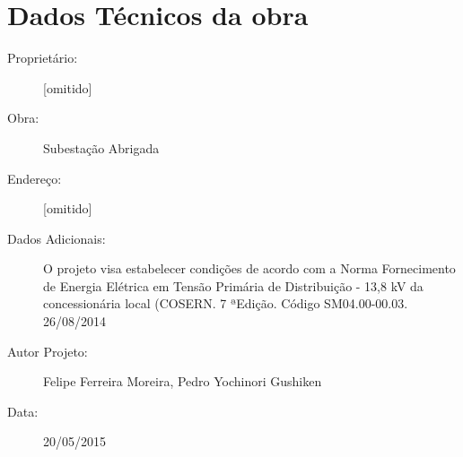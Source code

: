 \section{Dados Técnicos da obra}
\begin{description}
\item [Proprietário:] [omitido]
\item [Obra:] Subestação Abrigada
\item [Endereço:] [omitido]
\item [Dados Adicionais:] O projeto visa estabelecer condições de acordo com a Norma Fornecimento de Energia Elétrica em Tensão Primária de Distribuição - 13,8 kV da concessionária
local (COSERN. 7 ªEdição. Código SM04.00-00.03. 26/08/2014
\item [Autor Projeto:] Felipe Ferreira Moreira, Pedro Yochinori Gushiken
\item [Data:] 20/05/2015
\end{description}